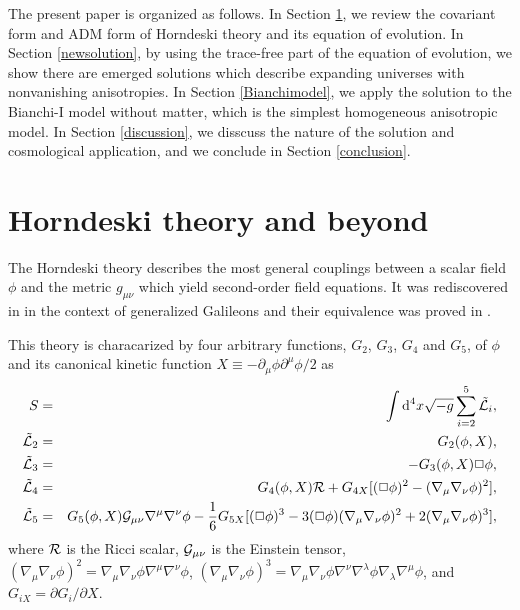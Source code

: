 \documentclass[aps,prd,preprint,superscriptaddress,nofootinbib,tightenlines]{revtex4-1}
\begin{document}
The present paper is organized as follows.
In Section \ref{Horndeskitheory}, we review the covariant form and ADM form of Horndeski theory and its equation of evolution.
In Section \ref{newsolution}, by using the trace-free part of the equation of evolution, we show there are emerged solutions which describe
expanding universes with nonvanishing anisotropies.
In Section \ref{Bianchimodel}, we apply the solution to the Bianchi-I model without matter,
which is the simplest homogeneous anisotropic model.
In Section \ref{discussion}, we disscuss the nature of the solution and cosmological application,
and we conclude in Section \ref{conclusion}.



\section{Horndeski theory and beyond}\label{Horndeskitheory}
The
Horndeski theory \cite{Horndeski:1974wa} describes the most general couplings between a scalar field $\phi$
and the metric $g_{\mu\nu}$
which yield second-order field equations.
It was rediscovered in \cite{Deffayet:2011gz} in the context of generalized Galileons
and their equivalence was proved in \cite{Kobayashi:2011nu}.

This theory is characarized by four arbitrary functions, $G_2$, $G_3$, $G_4$ and $G_5$,
of $\phi$ and its canonical kinetic function $X\equiv-\partial_\mu\phi \partial^\mu\phi/2$ as
\begin{eqnarray}
S&=&\int \mathrm{d}^4x \sqrt{-g} \sum_{i=2}^{5} \tilde{\mathcal{L}}_i, \label{Horndeski}
\\
\tilde{\mathcal{L}}_2&=&G_2(\phi,X),\\
\tilde{\mathcal{L}}_3&=&-G_3(\phi,X)\Box\phi,\\
\tilde{\mathcal{L}}_4&=&G_4(\phi,X){\cal R}
+G_{4X}[(\Box\phi)^2-(\nabla_\mu \nabla_\nu \phi)^2],\\
\tilde{\mathcal{L}}_5&=&G_5(\phi,X){\cal G}_{\mu\nu}\nabla^\mu \nabla^\nu \phi
-\frac{1}{6}G_{5X}[(\Box\phi)^3-3(\Box\phi)(\nabla_\mu \nabla_\nu \phi)^2
+2(\nabla_\mu \nabla_\nu \phi)^3],
\end{eqnarray}
where ${\cal R}$
is the Ricci scalar, ${\cal G}_{\mu\nu}$ is the Einstein tensor,
$(\nabla_\mu\nabla_\nu\phi)^2=\nabla_\mu\nabla_\nu\phi\nabla^\mu\nabla^\nu\phi$,
$(\nabla_\mu\nabla_\nu\phi)^3=\nabla_\mu\nabla_\nu\phi\nabla^\nu\nabla^\lambda%
\phi\nabla_\lambda\nabla^\mu\phi$,
and $G_{iX}=\partial G_i/\partial X$.
\end{document}
